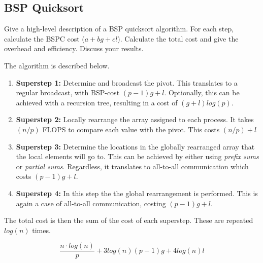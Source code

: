 \documentclass[../main.tex]{subfiles}
\begin{document}
\subsection{BSP Quicksort}
\begin{question}
Give a high-level description of a BSP quicksort algorithm. For each step, calculate the BSPC cost ($a + bg + cl$).
Calculate the total cost and give the overhead and efficiency. Discuss your results.
\end{question}
\begin{solution} The algorithm is described below.

\begin{enumerate}
	\item \textbf{Superstep 1:} Determine and broadcast the pivot. This translates to a regular broadcast, with BSP-cost $(p-1)g + l$. Optionally, this can be achieved with a recursion tree, resulting in a cost of $(g+l) log (p)$.
	\item \textbf{Superstep 2:} Locally rearrange the array assigned to each process. It takes $(n/p)$ FLOPS to compare each value with the pivot. This costs $(n/p) + l$
	\item \textbf{Superstep 3:} Determine the locations in the globally rearranged array that the local elements will go to. This can be achieved by either using \emph{prefix sums} or \emph{partial sums}. Regardless, it translates to all-to-all communication which costs $(p-1)g + l$.
	\item \textbf{Superstep 4:} In this step the the global rearrangement is performed. This is again a case of all-to-all communication, costing $(p-1)g + l$.
\end{enumerate}

The total cost is then the sum of the cost of each superstep. These are repeated $log(n)$ times.

\begin{equation}
\frac{n \cdot log(n)}{p} + 3log(n)(p-1)g + 4log(n)l
\end{equation}

\end{solution}
\end{document}
